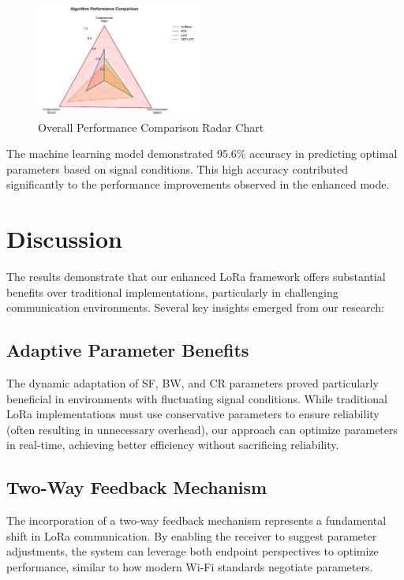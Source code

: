 \documentclass[conference]{IEEEtran}
\begin{document}
\begin{figure}[htbp]
\centering
\includegraphics[width=0.48\textwidth]{images/overall-comparison-radar-chart.png}
\caption{Overall Performance Comparison Radar Chart}
\label{fig:radar_chart}
\end{figure}

The machine learning model demonstrated 95.6\% accuracy in predicting optimal parameters based on signal conditions. This high accuracy contributed significantly to the performance improvements observed in the enhanced mode.

\section{Discussion}
The results demonstrate that our enhanced LoRa framework offers substantial benefits over traditional implementations, particularly in challenging communication environments. Several key insights emerged from our research:

\subsection{Adaptive Parameter Benefits}
The dynamic adaptation of SF, BW, and CR parameters proved particularly beneficial in environments with fluctuating signal conditions. While traditional LoRa implementations must use conservative parameters to ensure reliability (often resulting in unnecessary overhead), our approach can optimize parameters in real-time, achieving better efficiency without sacrificing reliability.

\subsection{Two-Way Feedback Mechanism}
The incorporation of a two-way feedback mechanism represents a fundamental shift in LoRa communication. By enabling the receiver to suggest parameter adjustments, the system can leverage both endpoint perspectives to optimize performance, similar to how modern Wi-Fi standards negotiate parameters.
\end{document}
